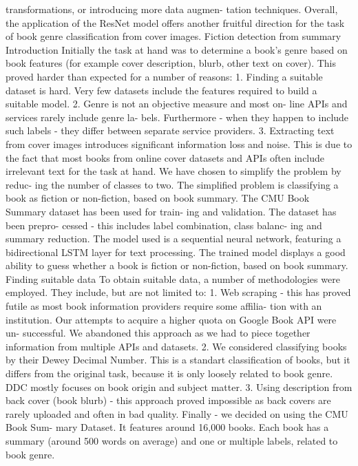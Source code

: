 transformations, or introducing more data augmen-
tation techniques. Overall, the application of the
ResNet model offers another fruitful direction for the
task of book genre classification from cover images.
Fiction detection from summary
Introduction
Initially the task at hand was to determine a book’s
genre based on book features (for example cover
description, blurb, other text on cover). This proved
harder than expected for a number of reasons:
1. Finding a suitable dataset is hard. Very few
datasets include the features required to build a
suitable model.
2. Genre is not an objective measure and most on-
line APIs and services rarely include genre la-
bels. Furthermore - when they happen to include
such labels - they differ between separate service
providers.
3. Extracting text from cover images introduces
significant information loss and noise. This is
due to the fact that most books from online cover
datasets and APIs often include irrelevant text
for the task at hand.
We have chosen to simplify the problem by reduc-
ing the number of classes to two.
The simplified problem is classifying a book as
fiction or non-fiction, based on book summary. The
CMU Book Summary dataset has been used for train-
ing and validation. The dataset has been prepro-
cessed - this includes label combination, class balanc-
ing and summary reduction. The model used is a
sequential neural network, featuring a bidirectional
LSTM layer for text processing. The trained model
displays a good ability to guess whether a book is
fiction or non-fiction, based on book summary.
Finding suitable data
To obtain suitable data, a number of methodologies
were employed. They include, but are not limited to:
1. Web scraping - this has proved futile as most
book information providers require some affilia-
tion with an institution. Our attempts to acquire
a higher quota on Google Book API were un-
successful. We abandoned this approach as we
had to piece together information from multiple
APIs and datasets.
2. We considered classifying books by their Dewey
Decimal Number. This is a standart classification
of books, but it differs from the original task,
because it is only loosely related to book genre.
DDC mostly focuses on book origin and subject
matter.
3. Using description from back cover (book blurb) -
this approach proved impossible as back covers
are rarely uploaded and often in bad quality.
Finally - we decided on using the CMU Book Sum-
mary Dataset. It features around 16,000 books. Each
book has a summary (around 500 words on average)
and one or multiple labels, related to book genre.
